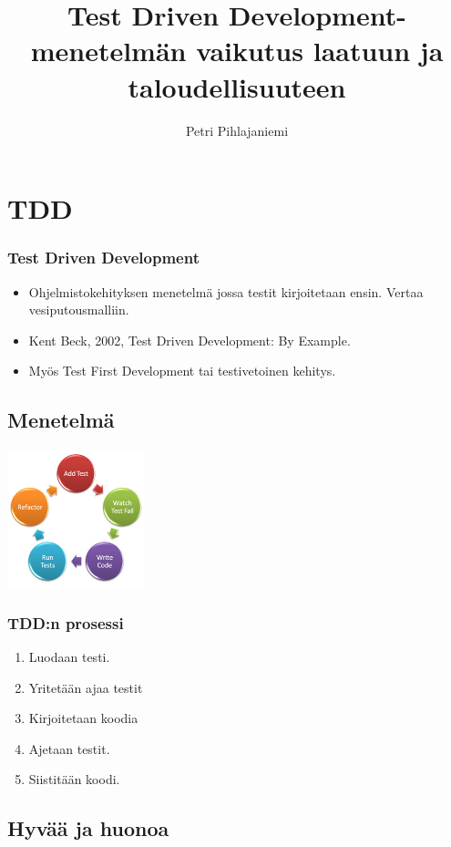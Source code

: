 \documentclass{beamer}
\title[TDD] {Test Driven Development-menetelmän vaikutus laatuun ja taloudellisuuteen}
\author[] 
{Petri Pihlajaniemi}
\begin{document}
\frame{\titlepage}

\section{TDD}

\begin{frame}
    	\frametitle{Test Driven Development}
	\begin{itemize}
		\item Ohjelmistokehityksen menetelmä jossa testit kirjoitetaan ensin. Vertaa vesiputousmalliin.
		\item Kent Beck, 2002, Test Driven Development: By Example. 
		\item Myös Test First Development tai testivetoinen kehitys.
	\end{itemize}
\end{frame}


\subsection{Menetelmä}

\begin{frame}
\includegraphics[width=4cm,height=4cm]{tddcycle.jpg}
	\frametitle{TDD:n prosessi}
	\begin{enumerate}
	\item Luodaan testi.
	\item Yritetään ajaa testit
	\item Kirjoitetaan koodia
	\item Ajetaan testit.
	\item Siistitään koodi.
	\end{enumerate}
\end{frame}

\subsection{Hyvää ja  huonoa}
\end{document}
